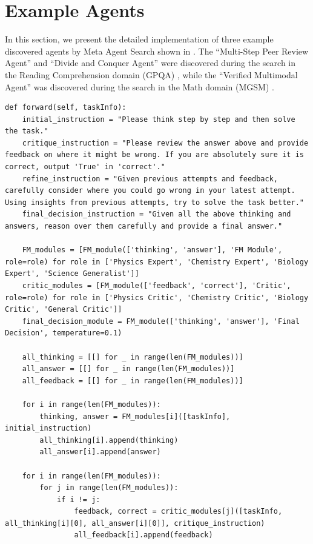 \documentclass{article}
\newcommand{\ouralgo}{Meta Agent Search\xspace}
\begin{document}
\section{Example Agents}
\label{append_section:example_agents}

In this section, we present the detailed implementation of three example discovered agents by \ouralgo shown in . The ``Multi-Step Peer Review Agent'' and ``Divide and Conquer Agent'' were discovered during the search in the Reading Comprehension domain (GPQA) \citep{rein2023gpqa}, while the ``Verified Multimodal Agent'' was discovered during the search in the Math domain (MGSM) \citep{shi2023language}.

\begin{lstlisting}[style=pythonstyle, caption={Example discovered agent: Multi-Step Peer Review Agent}]
def forward(self, taskInfo):
    initial_instruction = "Please think step by step and then solve the task."
    critique_instruction = "Please review the answer above and provide feedback on where it might be wrong. If you are absolutely sure it is correct, output 'True' in 'correct'."
    refine_instruction = "Given previous attempts and feedback, carefully consider where you could go wrong in your latest attempt. Using insights from previous attempts, try to solve the task better."
    final_decision_instruction = "Given all the above thinking and answers, reason over them carefully and provide a final answer."

    FM_modules = [FM_module(['thinking', 'answer'], 'FM Module', role=role) for role in ['Physics Expert', 'Chemistry Expert', 'Biology Expert', 'Science Generalist']]
    critic_modules = [FM_module(['feedback', 'correct'], 'Critic', role=role) for role in ['Physics Critic', 'Chemistry Critic', 'Biology Critic', 'General Critic']]
    final_decision_module = FM_module(['thinking', 'answer'], 'Final Decision', temperature=0.1)

    all_thinking = [[] for _ in range(len(FM_modules))]
    all_answer = [[] for _ in range(len(FM_modules))]
    all_feedback = [[] for _ in range(len(FM_modules))]

    for i in range(len(FM_modules)):
        thinking, answer = FM_modules[i]([taskInfo], initial_instruction)
        all_thinking[i].append(thinking)
        all_answer[i].append(answer)

    for i in range(len(FM_modules)):
        for j in range(len(FM_modules)):
            if i != j:
                feedback, correct = critic_modules[j]([taskInfo, all_thinking[i][0], all_answer[i][0]], critique_instruction)
                all_feedback[i].append(feedback)


\end{lstlisting}
\end{document}
